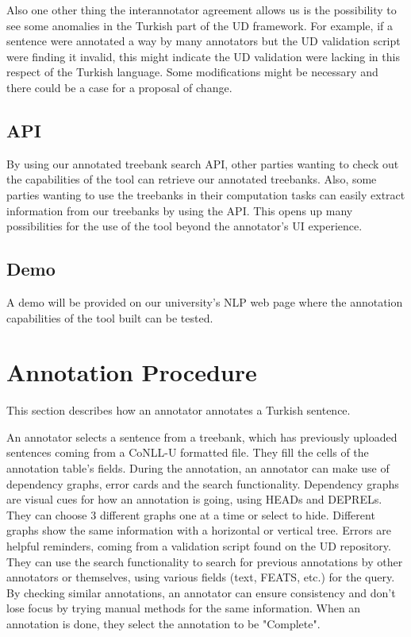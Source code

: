\documentclass[
]{ceurart}
\begin{document}
Also one other thing the interannotator agreement allows us is the possibility to see some anomalies in the Turkish part of the UD framework.
For example, if a sentence were annotated a way by many annotators but the UD validation script were finding it invalid, this might indicate the UD validation were lacking in this respect of the Turkish language.
Some modifications might be necessary and there could be a case for a proposal of change.

\subsection{API}
\label{sec:api}

By using our annotated treebank search API, other parties wanting to check out the capabilities of the tool can retrieve our annotated treebanks.
Also, some parties wanting to use the treebanks in their computation tasks can easily extract information from our treebanks by using the API.
This opens up many possibilities for the use of the tool beyond the annotator's UI experience.

\subsection{Demo}
\label{sec:demo}

A demo will be provided on our university's NLP web page where the annotation capabilities of the tool built can be tested.

\section{Annotation Procedure}
\label{sec:annotation}
This section describes how an annotator annotates a Turkish sentence.

An annotator selects a sentence from a treebank, which has previously uploaded sentences coming from a CoNLL-U formatted file.
They fill the cells of the annotation table's fields.
During the annotation, an annotator can make use of dependency graphs, error cards and the search functionality.
Dependency graphs are visual cues for how an annotation is going, using HEADs and DEPRELs.
They can choose 3 different graphs one at a time or select to hide.
Different graphs show the same information with a horizontal or vertical tree.
Errors are helpful reminders, coming from a validation script found on the UD repository.
They can use the search functionality to search for previous annotations by other annotators or themselves, using various fields (text, FEATS, etc.) for the query.
By checking similar annotations, an annotator can ensure consistency and don't lose focus by trying manual methods for the same information.
When an annotation is done, they select the annotation to be "Complete".
\end{document}

